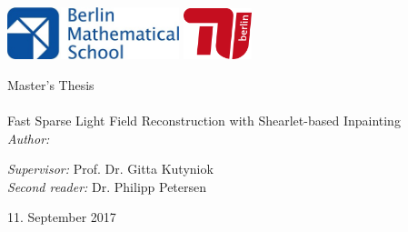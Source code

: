 \documentclass[11pt, english, singlespacing, headsepline, ]{MastersDoctoralThesis}
\author{Héctor Andrade Loarca} %
\theoremstyle{definition}
\begin{document}
\frontmatter %

\pagestyle{plain} %


\begin{titlepage}
\centering\includegraphics*[width=5cm]{bms-logo.jpg} \vspace{50pt}\includegraphics*[width=2cm]{tu-logo.jpg} \\

\begin{center}

{\LARGE \univname\par}\vspace{1.5cm} %
\Large Master's Thesis\\[0.5cm] %

\HRule \\[0.4cm] %
\huge
Fast Sparse Light Field Reconstruction with Shearlet-based Inpainting
\vspace{0.4cm} %
\HRule \\[1.5cm] %
 \normalsize
\emph{Author:}\\
{\authorname} %


\vspace{4cm}

\begin{flushleft} 
\emph{Supervisor:} Prof. Dr. Gitta Kutyniok\\
\emph{Second reader:} Dr. Philipp Petersen\\
\end{flushleft} 


\vspace{1cm}
 \facname

{\large 11. September 2017}\\[4cm] %
 
\vfill
\end{center}
\end{titlepage}
\end{document}
